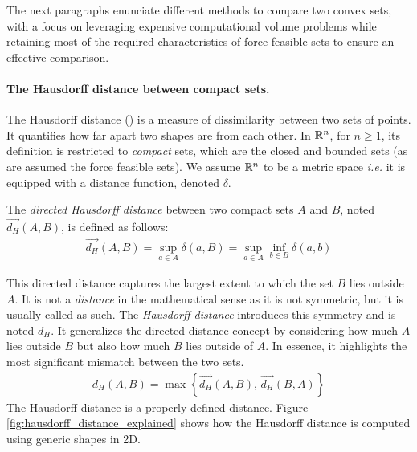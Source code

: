 The next paragraphs enunciate different methods to compare two convex sets, with a focus on leveraging expensive computational volume problems while retaining most of the required characteristics of force feasible sets to ensure an effective comparison.

\paragraph*{The Hausdorff distance between compact sets.}
The Hausdorff distance (\cite{hausdorffGrundzuegeMengenlehre1914}) is a measure of dissimilarity between two sets of points. It quantifies how far apart two shapes are from each other. In $\mathbb{R}^n$, for $n \geq 1$, its definition is restricted to \emph{compact} sets, which are the closed and bounded sets (as are assumed the force feasible sets). We assume $\mathbb{R}^n$ to be a metric space \emph{i.e.} it is equipped with a distance function, denoted $\delta$. 

The \emph{directed Hausdorff distance} between two compact sets $A$ and $B$, noted $\overrightarrow{d_H}(A,B)$, is defined as follows:
\begin{align*}
    \overrightarrow{d_H}(A,B) = \sup_{a\in A} \delta(a, B) = \sup_{a\in A} \inf_{b\in B} \delta(a, b)
\end{align*}

This directed distance captures the largest extent to which the set $B$ lies outside $A$. It is not a \emph{distance} in the mathematical sense as it is not symmetric, but it is usually called as such. The \emph{Hausdorff distance} introduces this symmetry and is noted $d_H$. It generalizes the directed distance concept by considering how much $A$ lies outside $B$ but also how much $B$ lies outside of $A$. In essence, it highlights the most significant mismatch between the two sets.
\begin{align*}
    d_H(A, B) = \max \left\{ \overrightarrow{d_H}(A,B),\, \overrightarrow{d_H}(B,A) \right\}
\end{align*}
The Hausdorff distance is a properly defined distance. Figure \ref{fig:hausdorff_distance_explained} shows how the Hausdorff distance is computed using generic shapes in 2D.

